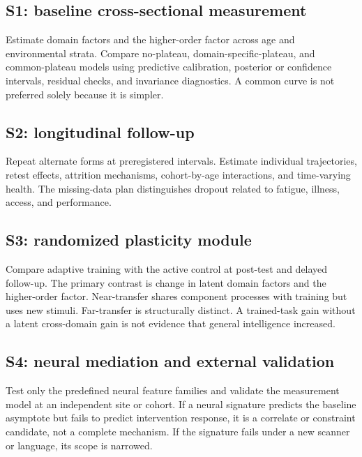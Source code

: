 \documentclass[conference]{IEEEtran}
\begin{document}
\subsection{S1: baseline cross-sectional measurement}
Estimate domain factors and the higher-order factor across age and environmental strata. Compare no-plateau, domain-specific-plateau, and common-plateau models using predictive calibration, posterior or confidence intervals, residual checks, and invariance diagnostics. A common curve is not preferred solely because it is simpler.

\subsection{S2: longitudinal follow-up}
Repeat alternate forms at preregistered intervals. Estimate individual trajectories, retest effects, attrition mechanisms, cohort-by-age interactions, and time-varying health. The missing-data plan distinguishes dropout related to fatigue, illness, access, and performance.

\subsection{S3: randomized plasticity module}
Compare adaptive training with the active control at post-test and delayed follow-up. The primary contrast is change in latent domain factors and the higher-order factor. Near-transfer shares component processes with training but uses new stimuli. Far-transfer is structurally distinct. A trained-task gain without a latent cross-domain gain is not evidence that general intelligence increased.

\subsection{S4: neural mediation and external validation}
Test only the predefined neural feature families and validate the measurement model at an independent site or cohort. If a neural signature predicts the baseline asymptote but fails to predict intervention response, it is a correlate or constraint candidate, not a complete mechanism. If the signature fails under a new scanner or language, its scope is narrowed.
\end{document}
